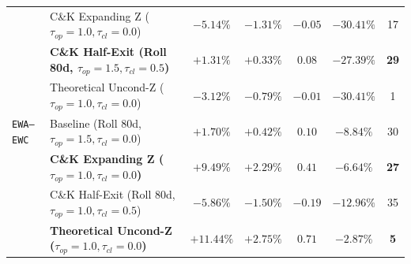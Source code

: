 \documentclass[11pt, a4paper]{article}
\begin{document}
\begin{table}[h!]
\begin{tabular}{llccccc}
                 & C\&K Expanding Z ($\tau_{op}=1.0, \tau_{cl}=0.0$)           & $-5.14\%$ & $-1.31\%$ & $-0.05$ & $-30.41\%$ & 17 \\
                 & \textbf{C\&K Half-Exit (Roll 80d, $\tau_{op}=1.5, \tau_{cl}=0.5$)} & $\mathbf{+1.31\%}$ & $\mathbf{+0.33\%}$ & $\mathbf{0.08}$ & $\mathbf{-27.39\%}$ & \textbf{29} \\
                 & Theoretical Uncond-Z ($\tau_{op}=1.0, \tau_{cl}=0.0$)       & $-3.12\%$ & $-0.79\%$ & $-0.01$ & $-30.41\%$ & 1 \\
\midrule
\texttt{EWA--EWC}& Baseline (Roll 80d, $\tau_{op}=1.5, \tau_{cl}=0.0$) & $+1.70\%$ & $+0.42\%$ & $0.10$ & $-8.84\%$  & 30 \\
                 & \textbf{C\&K Expanding Z ($\tau_{op}=1.0, \tau_{cl}=0.0$)}  & $\mathbf{+9.49\%}$ & $\mathbf{+2.29\%}$ & $\mathbf{0.41}$ & $\mathbf{-6.64\%}$  & \textbf{27} \\
                 & C\&K Half-Exit (Roll 80d, $\tau_{op}=1.0, \tau_{cl}=0.5$)   & $-5.86\%$ & $-1.50\%$ & $-0.19$ & $-12.96\%$ & 35 \\
                 & \textbf{Theoretical Uncond-Z ($\tau_{op}=1.0, \tau_{cl}=0.0$)} & $\mathbf{+11.44\%}$ & $\mathbf{+2.75\%}$ & $\mathbf{0.71}$ & $\mathbf{-2.87\%}$ & \textbf{5} \\
\bottomrule
\end{tabular}
\end{table}
\end{document}
